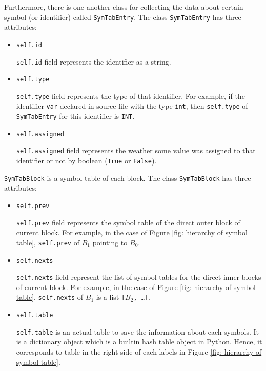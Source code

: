 \documentclass{article}
\newcommand{\code}[1]{\texttt{#1}}
\begin{document}
	Furthermore, there is one another class for collecting the data about certain symbol (or identifier) called \code{SymTabEntry}. The class \code{SymTabEntry} has three attributes:
	
	\begin{itemize}
		\item \code{self.id}
		
		\code{self.id} field represents the identifier as a string.
		
		\item \code{self.type}
		
		\code{self.type} field represents the type of that identifier. For example, if the identifier \code{var} declared in source file with the type \code{int}, then \code{self.type} of \code{SymTabEntry} for this identifier is \code{INT}.
		
		\item \code{self.assigned}
		
		\code{self.assigned} field represents the weather some value was assigned to that identifier or not by boolean (\code{True} or \code{False}).
	\end{itemize}
	
	\code{SymTabBlock} is a symbol table of each block. The class \code{SymTabBlock} has three attributes:
	
	\begin{itemize}
		\item \code{self.prev}
		
		\code{self.prev} field represents the symbol table of the direct outer block of current block. For example, in the case of Figure \ref{fig: hierarchy of symbol table}, \code{self.prev} of $B_1$ pointing to $B_0$.
		
		\item \code{self.nexts}
		
		\code{self.nexts} field represent the list of symbol tables for the direct inner blocks of current block. For example, in the case of Figure \ref{fig: hierarchy of symbol table}, \code{self.nexts} of $B_1$ is a list \code{[$B_2$, \dots]}.
		
		\item \code{self.table}
		
		\code{self.table} is an actual table to save the information about each symbols. It is a dictionary object which is a builtin hash table object in Python. Hence, it corresponds to table in the right side of each labels in Figure \ref{fig: hierarchy of symbol table}.
	\end{itemize}
	
\end{document}
